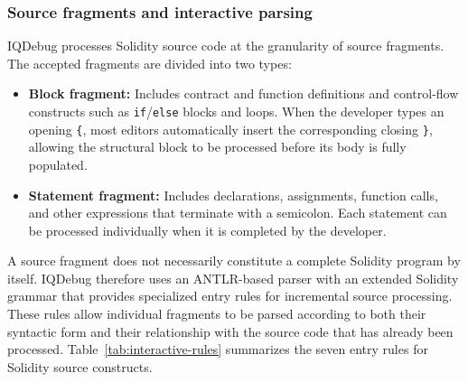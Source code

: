 \documentclass[11pt,oneside]{report}
\theoremstyle{plain}
\theoremstyle{definition}
\theoremstyle{remark}
\begin{document}
\subsubsection{Source fragments and interactive parsing}
\label{subsubsec:design:representation:parsing}
IQDebug processes Solidity source code at the granularity of source fragments.
The accepted fragments are divided into two types:

\begin{itemize}
  \item \textbf{Block fragment:} Includes contract and function definitions and control-flow constructs such as \texttt{if}/\texttt{else} blocks and loops. When the developer types an opening \texttt{\{}, most editors automatically insert the corresponding closing \texttt{\}}, allowing the structural block to be processed before its body is fully populated.

  \item \textbf{Statement fragment:} Includes declarations, assignments, function calls, and other expressions that terminate with a semicolon. Each statement can be processed individually when it is completed by the developer.       
\end{itemize}

A source fragment does not necessarily constitute a complete Solidity program by itself.
IQDebug therefore uses an ANTLR-based parser with an extended Solidity grammar that provides specialized entry rules for incremental source processing.
These rules allow individual fragments to be parsed according to both their syntactic form and their relationship with the source code that has already been processed.
Table~\ref{tab:interactive-rules} summarizes the seven entry rules for Solidity source constructs.
\end{document}
